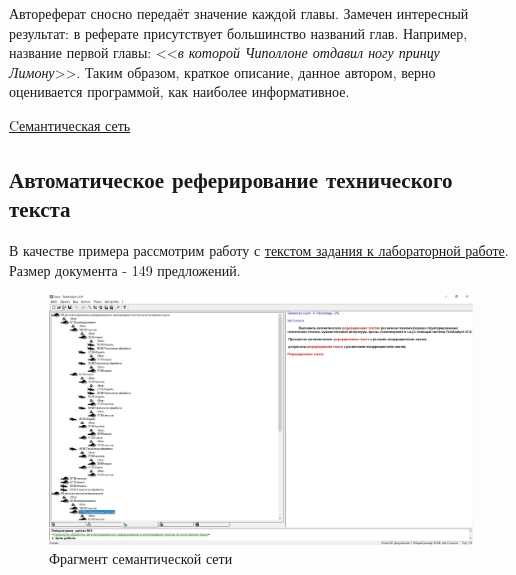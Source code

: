 		\begin{table} [htbp]
			\centering
			\caption{Результаты автоматического реферирования}
			\label{table:trio}%
		\end{table}
	
		Автореферат сносно передаёт значение каждой главы.
		Замечен интересный результат: в реферате присутствует большинство названий глав. 
		Например, название первой главы: <<\textit{в которой Чиполлоне отдавил ногу принцу Лимону}>>.
		Таким образом, краткое описание, данное автором, верно оценивается программой, как наиболее информативное.
		
		\href{./listings/chipollino.html}{Cемантическая сеть}
		
		\subsection{Автоматическое реферирование технического текста}
		В качестве примера рассмотрим работу с \href{./listings/lab-3.txt}{текстом задания к лабораторной работе}.
		Размер документа - 149 предложений.
		
				
		\begin{figure}[h]
			\centering
			\includegraphics[width=0.7\linewidth]{images/lab-3-semantic-net}
			\caption{Фрагмент семантической сети}
			\label{fig:lab-3-semantic-net}
		\end{figure}
	
